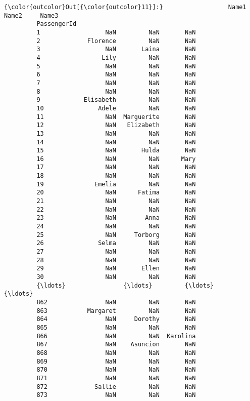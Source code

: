 \documentclass[11pt]{article}
\begin{document}
\begin{Verbatim}[commandchars=\\\{\}]
{\color{outcolor}Out[{\color{outcolor}11}]:}                  Name1       Name2     Name3
         PassengerId                                 
         1                  NaN         NaN       NaN
         2             Florence         NaN       NaN
         3                  NaN       Laina       NaN
         4                 Lily         NaN       NaN
         5                  NaN         NaN       NaN
         6                  NaN         NaN       NaN
         7                  NaN         NaN       NaN
         8                  NaN         NaN       NaN
         9            Elisabeth         NaN       NaN
         10               Adele         NaN       NaN
         11                 NaN  Marguerite       NaN
         12                 NaN   Elizabeth       NaN
         13                 NaN         NaN       NaN
         14                 NaN         NaN       NaN
         15                 NaN       Hulda       NaN
         16                 NaN         NaN      Mary
         17                 NaN         NaN       NaN
         18                 NaN         NaN       NaN
         19              Emelia         NaN       NaN
         20                 NaN      Fatima       NaN
         21                 NaN         NaN       NaN
         22                 NaN         NaN       NaN
         23                 NaN        Anna       NaN
         24                 NaN         NaN       NaN
         25                 NaN     Torborg       NaN
         26               Selma         NaN       NaN
         27                 NaN         NaN       NaN
         28                 NaN         NaN       NaN
         29                 NaN       Ellen       NaN
         30                 NaN         NaN       NaN
         {\ldots}                {\ldots}         {\ldots}       {\ldots}
         862                NaN         NaN       NaN
         863           Margaret         NaN       NaN
         864                NaN     Dorothy       NaN
         865                NaN         NaN       NaN
         866                NaN         NaN  Karolina
         867                NaN    Asuncion       NaN
         868                NaN         NaN       NaN
         869                NaN         NaN       NaN
         870                NaN         NaN       NaN
         871                NaN         NaN       NaN
         872             Sallie         NaN       NaN
         873                NaN         NaN       NaN

\end{Verbatim}
\end{document}
